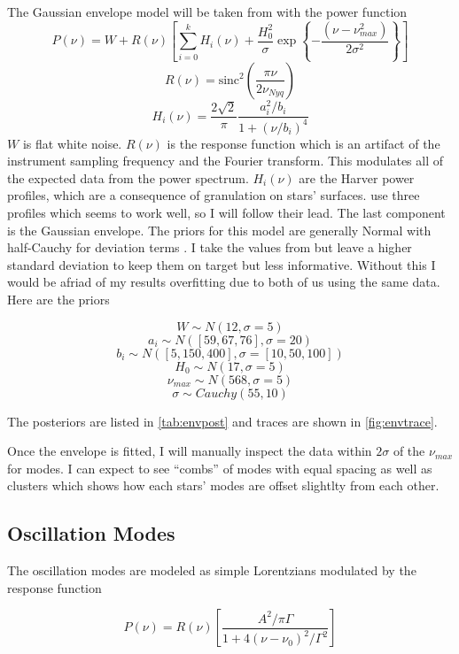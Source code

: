 \documentclass[
    aip,
    jmp,
    reprint,
    nofootinbib,
    floatfix
    ]{revtex4-1}
\begin{document}
    The Gaussian envelope model will be taken from \citet{li} with the power function
    \begin{equation}
        P(\nu) = W + R(\nu) \left[\sum_{i=0}^{k}{H_i(\nu)} + \frac{H_0^2}{\sigma} \exp \left\lbrace  -\frac{(\nu-\nu_{max}^2)}{2\sigma^2}\right\rbrace  \right]
        \label{eqn:env}
    \end{equation}
    $$ R(\nu) = \text{sinc}^2\left( \frac{\pi \nu}{2\nu_{Nyq}}\right) $$
    $$ H_i(\nu)=\frac{2\sqrt{2}}{\pi} \frac{a^2_i/b_i}{1+(\nu/b_i)^4} $$
    $W$ is flat white noise. $R(\nu)$ is the response function which is an artifact of the instrument sampling frequency and the Fourier transform. This modulates all of the expected data from the power spectrum. $H_i(\nu)$ are the Harver power profiles, which are a consequence of granulation on stars' surfaces. \citet{li} use three profiles which seems to work well, so I will follow their lead. The last component is the Gaussian envelope. The priors for this model are generally Normal with half-Cauchy for deviation terms \citep{halfcauchy}. I take the values from \citet{li} but leave a higher standard deviation to keep them on target but less informative. Without this I would be afriad of my results overfitting due to both of us using the same data. Here are the priors

    $$ W \sim N(12, \sigma=5) $$
    $$ a_i \sim N([59, 67, 76], \sigma=20) $$
    $$ b_i \sim N([5, 150, 400], \sigma=[10, 50, 100]) $$
    $$ H_0 \sim N(17, \sigma=5) $$
    $$ \nu_{max} \sim N(568, \sigma=5) $$
    $$ \sigma \sim Cauchy(55, 10) $$
    
    The posteriors are listed in \autoref{tab:envpost} and traces are shown in \autoref{fig:envtrace}. 

    Once the envelope is fitted, I will manually inspect the data within $2\sigma$ of the $\nu_{max}$ for modes. I can expect to see ``combs'' of modes with equal spacing as well as clusters which shows how each stars' modes are offset slightlty from each other. 
    
    \subsection{Oscillation Modes}

    The oscillation modes are modeled as simple Lorentzians modulated by the response function

    \begin{equation}
		P(\nu) = R(\nu) \left[ \frac{A^2/\pi\Gamma}{1+4(\nu-\nu_0)^2/\Gamma^2} \right]
    \end{equation}
    
\end{document}
